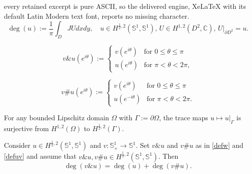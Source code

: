 \documentclass[10pt,a4paper]{amsart}
\newcommand{\sph}{\mathbb{S}}
\begin{document}
every retained excerpt is pure ASCII, so the delivered engine, XeLaTeX with its default Latin Modern text font, reports no missing character.
\begin{equation}\label{degformula2}
\deg(u):=\frac{1}{\pi}\int_D JU dxdy,\quad u\in H^{\frac{1}{2},2}(\sph^1,\sph^1), \, U\in H^{1,2}(D^2,\mathbb{C}), \, U|_{\partial D^2}=u.
\end{equation}

\begin{equation}\label{defw}
v\& u(e^{i\theta}):=
\begin{cases}
v(e^{i\theta}) &\text{for }0\le \theta\le \pi\\
u(e^{i\theta}) &\text{for } \pi <\theta< 2\pi,
\end{cases}
\end{equation}

\begin{equation}\label{defuv}
v\# u(e^{i\theta}):=
\begin{cases}
v(e^{i\theta}) &\text{for }0\le \theta\le \pi\\
u(e^{-i\theta}) &\text{for } \pi <\theta< 2\pi.
\end{cases}
\end{equation}

\begin{prop}\label{trace}
For any bounded Lipschitz domain $\Omega$ with $\Gamma:=\partial\Omega$, the trace maps $u\mapsto u|_\Gamma$ is surjective from $H^{1,2}(\Omega)$ to $H^{\frac12,2}(\Gamma)$.
\end{prop}

\begin{prop}\label{p:degjump} Consider $u \in H^{\frac{1}{2},2}(\sph^1,\sph^1)$ and $v:\sph^1_+\to \sph^1$. Set $v\&u$ and $v\#u$ as in \eqref{defw} and \eqref{defuv} and assume that $v\&u, v\#u\in H^{\frac{1}{2},2}(\sph^1,\sph^1)$. Then
\begin{equation}\label{eq:jump}
\deg(v\&u)= \deg(u)+\deg (v\#u).
\end{equation}
\end{prop}
\end{document}
